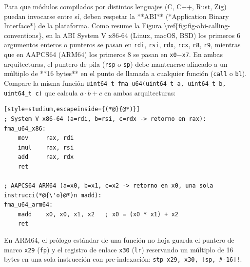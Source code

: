 \documentclass{book}
\begin{document}
Para que módulos compilados por distintos lenguajes (C, C++, Rust, Zig) puedan invocarse entre sí, deben respetar la **ABI** (*Application Binary Interface*) de la plataforma. Como resume la Figura \textbackslash{}ref\{fig:fig-abi-calling-conventions\}, en la ABI System V x86-64 (Linux, macOS, BSD) los primeros 6 argumentos enteros o punteros se pasan en \texttt{rdi}, \texttt{rsi}, \texttt{rdx}, \texttt{rcx}, \texttt{r8}, \texttt{r9}, mientras que en AAPCS64 (ARM64) los primeros 8 se pasan en \texttt{x0}\(-\)\texttt{x7}. En ambas arquitecturas, el puntero de pila (\texttt{rsp} o \texttt{sp}) debe mantenerse alineado a un múltiplo de **16 bytes** en el punto de llamada a cualquier función (\texttt{call} o \texttt{bl}). Compare la misma función \texttt{uint64\_t fma\_u64(uint64\_t a, uint64\_t b, uint64\_t c)} que calcula \(a \cdot b + c\) en ambas arquitecturas:
\begin{lstlisting}[style=studium,escapeinside={(*@}{@*)}]
; System V x86-64 (a=rdi, b=rsi, c=rdx -> retorno en rax):
fma_u64_x86:
    mov     rax, rdi
    imul    rax, rsi
    add     rax, rdx
    ret

; AAPCS64 ARM64 (a=x0, b=x1, c=x2 -> retorno en x0, una sola instrucci(*@{\'o}@*)n madd):
fma_u64_arm64:
    madd    x0, x0, x1, x2   ; x0 = (x0 * x1) + x2
    ret
\end{lstlisting}
En ARM64, el prólogo estándar de una función no hoja guarda el puntero de marco \texttt{x29} (\texttt{fp}) y el registro de enlace \texttt{x30} (\texttt{lr}) reservando un múltiplo de 16 bytes en una sola instrucción con pre-indexación: \texttt{stp x29, x30, [sp, \#-16]!}.
\end{document}
